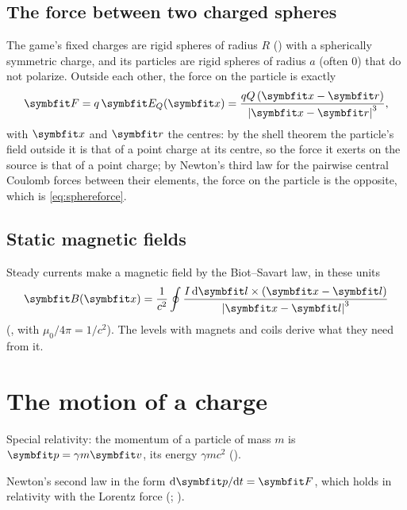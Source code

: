 \documentclass{leveldoc}
\begin{document}
\subsection{The force between two charged spheres}\label{sec:spheres}

The game's fixed charges are rigid spheres of radius $R$ () with
a spherically symmetric charge, and its particles are rigid spheres of radius $a$ (often $0$)
that do not polarize. Outside each other, the force on the particle is exactly
\begin{equation}\label{eq:sphereforce}
  \vect{F} = q\,\vect{E}_Q(\vect{x}) = \frac{qQ\,(\vect{x}-\vect{r})}{\abs{\vect{x}-\vect{r}}^3},
\end{equation}
with $\vect{x}$ and $\vect{r}$ the centres: by the shell theorem the particle's field outside
it is that of a point charge at its centre, so the force it exerts on the source is that of a
point charge; by Newton's third law for the pairwise central Coulomb forces between their
elements, the force on the particle is the opposite, which is \eqref{eq:sphereforce}.

\subsection{Static magnetic fields}

Steady currents make a magnetic field by the Biot--Savart law, in these units
\begin{equation}\label{eq:biotsavart}
  \vect{B}(\vect{x}) = \frac{1}{c^2}\oint \frac{I\,\dd\vect{l}\times(\vect{x}-\vect{l})}{\abs{\vect{x}-\vect{l}}^3}
\end{equation}
(, with $\mu_0/4\pi = 1/c^2$). The levels with magnets and coils derive what
they need from it.

\section{The motion of a charge}\label{sec:mechanics}

\begin{principles}
  \item Special relativity: the momentum of a particle of mass $m$ is
    $\vect{p} = \gamma m\vect{v}$, its energy $\gamma mc^2$ ().
  \item Newton's second law in the form $\dd\vect{p}/\dd t = \vect{F}$, which holds in
    relativity with the Lorentz force (; ).
\end{principles}
\end{document}
